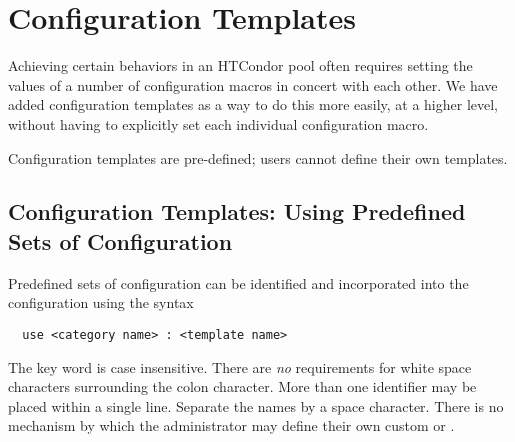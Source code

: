 
\section{\label{sec:Configuring-HTCondor-Templates}Configuration Templates}


Achieving certain behaviors in an HTCondor pool often requires
setting the values of a number of configuration macros in concert
with each other.  We have added configuration templates as a way
to do this more easily, at a higher level, without having to
explicitly set each individual configuration macro.

Configuration templates are pre-defined; users cannot define their
own templates.

\subsection{\label{sec:Config-Metaknobs}Configuration Templates: Using
Predefined Sets of Configuration}
Predefined sets of configuration can be identified and incorporated
into the configuration using the syntax
\begin{verbatim}
  use <category name> : <template name> 
\end{verbatim}

The  key word is case insensitive.
There are \emph{no} requirements for white space characters surrounding
the colon character.
More than one  identifier may be placed within
a single  line. 
Separate the names by a space character. 
There is no mechanism by which the administrator may define their
own custom  or .

